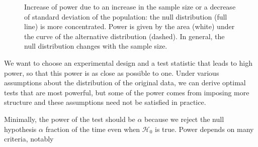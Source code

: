 \documentclass[
  11pt,
  letterpaper,
]{scrbook}
\theoremstyle{definition}
\theoremstyle{definition}
\theoremstyle{remark}
\begin{document}
\begin{figure}[ht!]


\caption{\label{fig-power3}Increase of power due to an increase in the
sample size or a decrease of standard deviation of the population: the
null distribution (full line) is more concentrated. Power is given by
the area (white) under the curve of the alternative distribution
(dashed). In general, the null distribution changes with the sample
size.}

\end{figure}%

We want to choose an experimental design and a test statistic that leads
to high power, so that this power is as close as possible to one. Under
various assumptions about the distribution of the original data, we can
derive optimal tests that are most powerful, but some of the power comes
from imposing more structure and these assumptions need not be satisfied
in practice.

Minimally, the power of the test should be \(\alpha\) because we reject
the null hypothesis \(\alpha\) fraction of the time even when
\(\mathscr{H}_0\) is true. Power depends on many criteria, notably
\end{document}
